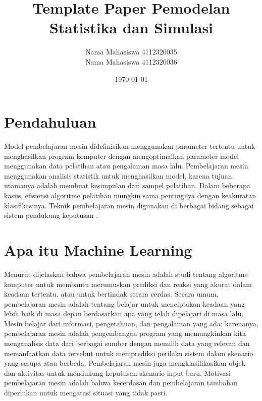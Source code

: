 \documentclass[a4paper,12pt]{article}
\theoremstyle{definition}
\begin{document}
    \title{Template Paper Pemodelan Statistika dan Simulasi}
    \author{
    Nama Mahasiswa 4112320035 \\
    Nama Mahasiswa 4112320036
    }
\date{\today}
\begin{titlepage}
    \maketitle
\end{titlepage}

\tableofcontents

\newpage
\section{Pendahuluan}
Model pembelajaran mesin didefinisikan menggunakan parameter tertentu untuk menghasilkan program komputer dengan mengoptimalkan parameter model menggunakan data pelatihan atau pengalaman masa lalu. Pembelajaran mesin menggunakan analisis statistik untuk menghasilkan model, karena tujuan utamanya adalah membuat kesimpulan dari sampel pelatihan. Dalam beberapa kasus, efisiensi algoritme pelatihan mungkin sama pentingnya dengan keakuratan klasifikasinya. Teknik pembelajaran mesin digunakan di berbagai bidang sebagai sistem pendukung keputusan \citep{Alpaydın2020}.


\section{Apa itu Machine Learning}
Menurut \cite{Kulkarni2012} dijelaskan bahwa pembelajaran mesin adalah studi tentang algoritme komputer untuk membantu merumuskan prediksi dan reaksi yang akurat dalam keadaan tertentu, atau untuk bertindak secara cerdas. Secara umum, pembelajaran mesin adalah tentang belajar untuk menciptakan keadaan yang lebih baik di masa depan berdasarkan apa yang telah dipelajari di masa lalu. Mesin belajar dari informasi, pengetahuan, dan pengalaman yang ada; karenanya, pembelajaran mesin adalah pengembangan program yang memungkinkan kita menganalisis data dari berbagai sumber dengan memilih data yang relevan dan memanfaatkan data tersebut untuk memprediksi perilaku sistem dalam skenario yang serupa atau berbeda. Pembelajaran mesin juga mengklasifikasikan objek dan aktivitas untuk mendukung keputusan skenario input baru. Motivasi pembelajaran mesin adalah bahwa kecerdasan dan pembelajaran tambahan diperlukan untuk mengatasi situasi yang tidak pasti.
\end{document}
